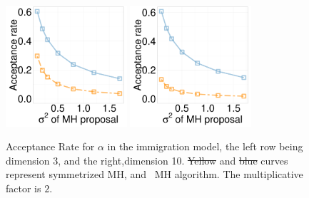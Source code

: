 \begin{figure}
  \end{figure}
  \begin{figure}[H]
  \centering

  \begin{minipage}[!hp]{0.99\linewidth}
    \includegraphics [width=0.40\textwidth, angle=0]{figs/acc/Q_D3alpha_k2.pdf}
	\hspace{.5in}
    \includegraphics [width=0.40\textwidth, angle=0]{figs/acc/Q_D10alpha_k2.pdf}
  \end{minipage}
    \caption{Acceptance Rate for $\alpha$ in the immigration model, the left row being dimension 3, and the right,dimension 10.  \sout{Yellow}  and \sout{blue}  curves represent symmetrized MH,
 and \naive\ MH  algorithm. The multiplicative factor is $2$. }
     \label{fig:ACC_Q}
  \end{figure}

